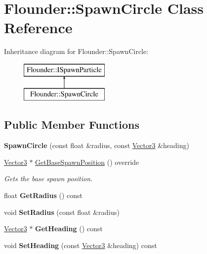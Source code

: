\hypertarget{class_flounder_1_1_spawn_circle}{}\section{Flounder\+:\+:Spawn\+Circle Class Reference}
\label{class_flounder_1_1_spawn_circle}
Inheritance diagram for Flounder\+:\+:Spawn\+Circle\+:\begin{figure}[H]
\begin{center}
\leavevmode
\includegraphics[height=2.000000cm]{class_flounder_1_1_spawn_circle}
\end{center}
\end{figure}
\subsection*{Public Member Functions}
\begin{DoxyCompactItemize}
\item 
\mbox{\label{class_flounder_1_1_spawn_circle_aac77956cbe515720675b6be079e67a7d}} 
{\bfseries Spawn\+Circle} (const float \&radius, const \hyperlink{class_flounder_1_1_vector3}{Vector3} \&heading)
\item 
\hyperlink{class_flounder_1_1_vector3}{Vector3} $\ast$ \hyperlink{class_flounder_1_1_spawn_circle_a8f6d8449b4608abf4e45d9e045f20ae5}{Get\+Base\+Spawn\+Position} () override
\begin{DoxyCompactList}\small\item\em Gets the base spawn position. \end{DoxyCompactList}\item 
\mbox{\label{class_flounder_1_1_spawn_circle_ad6ed60890a556f88889869da8bc97155}} 
float {\bfseries Get\+Radius} () const
\item 
\mbox{\label{class_flounder_1_1_spawn_circle_a6784b547ad2ff452f6eb8045a3f2379e}} 
void {\bfseries Set\+Radius} (const float \&radius)
\item 
\mbox{\label{class_flounder_1_1_spawn_circle_afa323cf167ea4de3173886d501cdaba8}} 
\hyperlink{class_flounder_1_1_vector3}{Vector3} $\ast$ {\bfseries Get\+Heading} () const
\item 
\mbox{\label{class_flounder_1_1_spawn_circle_abd16a1398591a9da244791ea49a48985}} 
void {\bfseries Set\+Heading} (const \hyperlink{class_flounder_1_1_vector3}{Vector3} \&heading) const
\end{DoxyCompactItemize}
